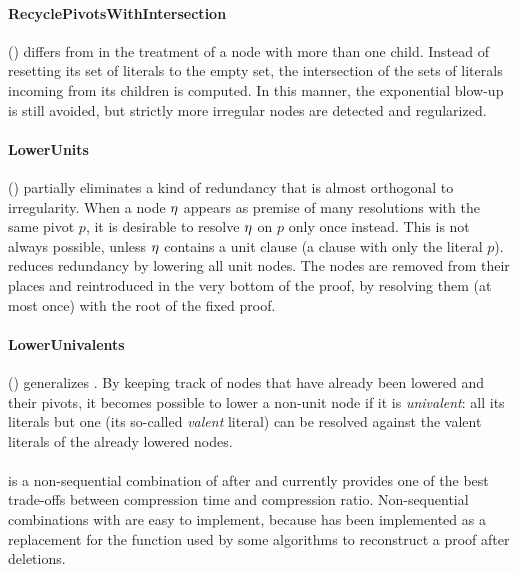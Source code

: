 \documentclass{llncs}
\begin{document}
\paragraph{RecyclePivotsWithIntersection} () \cite{LURPI}
differs from  in the treatment of a node with more than one child. Instead of resetting its set of literals to the empty set, the intersection of the sets of literals incoming from its children is computed. In this manner, the exponential blow-up is still avoided, but strictly more irregular nodes are detected and regularized.


\paragraph{LowerUnits} () \cite{LURPI} partially eliminates a kind of redundancy that is almost orthogonal to irregularity. When a node $\eta$ appears as premise of many resolutions
with the same pivot $p$, it is desirable to resolve $\eta$ on $p$ only once instead. This is not always possible, unless $\eta$ contains a unit clause (a clause with only the literal $p$).
 reduces redundancy by lowering all unit nodes. The nodes are removed from their places and reintroduced in the very bottom of the proof, by resolving them (at most once) with the root of the fixed proof. 


\paragraph{LowerUnivalents} () \cite{LUniv} generalizes . By
keeping track of nodes that have already been lowered and their pivots, it becomes
possible to lower a non-unit node if it is \emph{univalent}: all its literals but one (its so-called \emph{valent} literal) can be resolved against the valent literals of the already lowered nodes. 


\paragraph{} \cite{LUniv} is a non-sequential combination of  after  and currently provides one of the best trade-offs between compression time and compression ratio. Non-sequential combinations with  are easy to implement, because  has been implemented as a replacement for the  function used by some algorithms to reconstruct a proof after deletions. 
%
\end{document}
